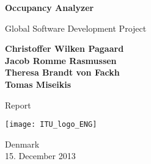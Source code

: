 \begin{titlepage}
	\begin{center}
		\vspace*{1cm}
		
		\Huge
		\textbf{Occupancy Analyzer}
		
		\vspace{0.5cm}
		\LARGE
		Global Software Development Project
		
		\vspace{1.5cm}
		
		\textbf{
			Christoffer Wilken Pagaard\\
			Jacob Romme Rasmussen\\
			Theresa Brandt von Fackh\\
			Tomas Miseikis\\
		}
		
		\vfill
		
		Report
		
		\vspace{0.8cm}
		
		\texttt{[image: ITU\_logo\_ENG]}
		
		\Large
		Denmark\\
		15. December 2013
		
	\end{center}
\end{titlepage}